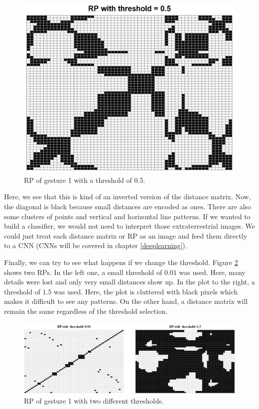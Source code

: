 \documentclass[
  11pt,
]{krantz}
\begin{document}
\begin{figure}

{\centering \includegraphics[width=0.9\linewidth]{images/rp_rp_5} 

}

\caption{RP of gesture 1 with a threshold of 0.5.}\label{fig:gesture1rp5}
\end{figure}

Here, we see that this is kind of an inverted version of the distance matrix. Now, the diagonal is black because small distances are encoded as ones. There are also some clusters of points and vertical and horizontal line patterns. If we wanted to build a classifier, we would not need to interpret those extraterrestrial images. We could just treat each distance matrix or RP as an image and feed them directly to a CNN (CNNs will be covered in chapter \ref{deeplearning}).

Finally, we can try to see what happens if we change the threshold. Figure \ref{fig:rpComp} shows two RPs. In the left one, a small threshold of \(0.01\) was used. Here, many details were lost and only very small distances show up. In the plot to the right, a threshold of \(1.5\) was used. Here, the plot is cluttered with black pixels which makes it difficult to see any patterns. On the other hand, a distance matrix will remain the same regardless of the threshold selection.

\begin{figure}

{\centering \includegraphics[width=0.9\linewidth]{images/rp_comp} 

}

\caption{RP of gesture 1 with two different thresholds.}\label{fig:rpComp}
\end{figure}
\end{document}
